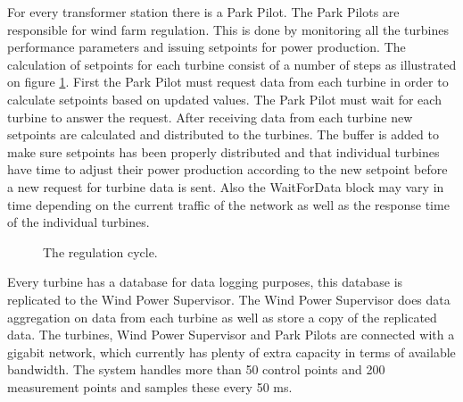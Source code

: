 For every transformer station there is a Park Pilot. The Park Pilots are responsible for wind farm regulation. This is done by monitoring all the turbines performance parameters and issuing setpoints for power production. The calculation of setpoints for each turbine consist of a number of steps as illustrated on figure \cref{fig:currentSiemensCycleTime}. First the Park Pilot must request data from each turbine in order to calculate setpoints based on updated values. The Park Pilot must wait for each turbine to answer the request. After receiving data from each turbine new setpoints are calculated and distributed to the turbines. The buffer is added to make sure setpoints has been properly distributed and that individual turbines have time to adjust their power production according to the new setpoint before a new request for turbine data is sent. Also the WaitForData block may vary in time depending on the current traffic of the network as well as the response time of the individual turbines.

\begin{figure}[!h]
	\centering
	
	\caption[The current Siemens wind farm system overview]{
		\label{fig:currentSiemensCycleTime} 
		\footnotesize{%
			The regulation cycle.
		}
	}
\end{figure}

Every turbine has a database for data logging purposes, this database is replicated to the Wind Power Supervisor.
The Wind Power Supervisor does data aggregation on data from each turbine as well as store a copy of the replicated data.
The turbines, Wind Power Supervisor and Park Pilots are connected with a gigabit network, which currently has plenty of extra capacity in terms of available bandwidth.
The system handles more than 50 control points and 200 measurement points and samples these every 50 ms.

%	
%		
%	
%					
%

